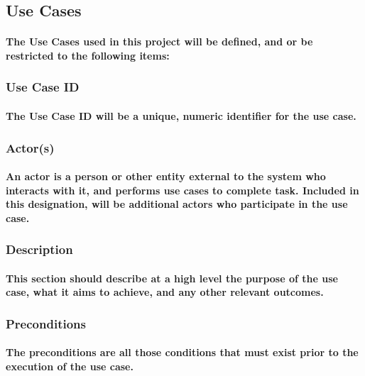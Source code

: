 

\subsection{Use Cases}
\paragraph{The Use Cases used in this project will be defined, and or be restricted to the following items:}
\subsubsection{Use Case ID}
\paragraph{The Use Case ID will be a unique, numeric identifier for the use case.}

\subsubsection{Actor(s)}
\paragraph{An actor is a person or other entity external to the system who interacts with it, and performs use cases to complete task. Included in this designation, will be additional actors who participate in the use case.}

\subsubsection{Description}
\paragraph{This section should describe at a high level the purpose of the use case, what it aims to achieve, and any other relevant outcomes.}

\subsubsection{Preconditions}
\paragraph{The preconditions are all those conditions that must exist prior to the execution of the use case.}

